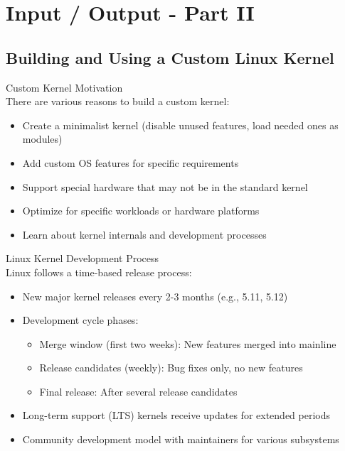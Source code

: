 \section{Input / Output - Part II}

\subsection{Building and Using a Custom Linux Kernel}

\begin{concept}{Custom Kernel Motivation}\\
    There are various reasons to build a custom kernel:
    \begin{itemize}
        \item Create a minimalist kernel (disable unused features, load needed ones as modules)
        \item Add custom OS features for specific requirements
        \item Support special hardware that may not be in the standard kernel
        \item Optimize for specific workloads or hardware platforms
        \item Learn about kernel internals and development processes
    \end{itemize}
\end{concept}

\begin{definition}{Linux Kernel Development Process}\\
    Linux follows a time-based release process:
    \begin{itemize}
        \item New major kernel releases every 2-3 months (e.g., 5.11, 5.12)
        \item Development cycle phases:
            \begin{itemize}
                \item Merge window (first two weeks): New features merged into mainline
                \item Release candidates (weekly): Bug fixes only, no new features
                \item Final release: After several release candidates
            \end{itemize}
        \item Long-term support (LTS) kernels receive updates for extended periods
        \item Community development model with maintainers for various subsystems
    \end{itemize}
\end{definition}

